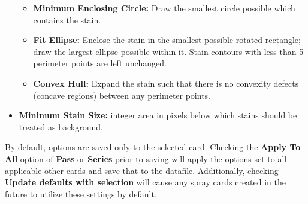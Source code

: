 \documentclass[10pt,letterpaper,titlepage]{article}
\begin{document}
\begin{itemize}
\begin{itemize}
            \item \textbf{Minimum Enclosing Circle:} Draw the smallest circle possible which contains the stain.
            \item \textbf{Fit Ellipse:} Enclose the stain in the smallest possible rotated rectangle; draw the largest ellipse possible within it. Stain contours with less than 5 perimeter points are left unchanged.
            \item \textbf{Convex Hull:} Expand the stain such that there is no convexity defects (concave regions) between any perimeter points.
        \end{itemize}
        \item \textbf{Minimum Stain Size:} integer area in pixels below which stains should be treated as background.
    \end{itemize}
    By default, options are saved only to the selected card. Checking the \textbf{Apply To All} option of \textbf{Pass} or \textbf{Series} prior to saving will apply the options set to all applicable other cards and save that to the datafile. Additionally, checking \textbf{Update defaults with selection} will cause any spray cards created in the future to utilize these settings by default.
    
\end{document}
